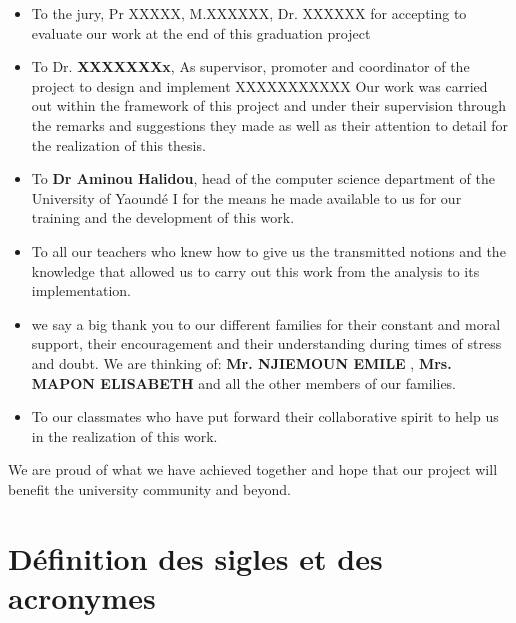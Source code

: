 \documentclass[12pt,a4paper,oneside]{extbook}
\begin{document}
\begin{itemize}
    

\item To the jury, Pr XXXXX, M.XXXXXX, Dr. XXXXXX for accepting to evaluate our
work at the end of this graduation project



\item To Dr. \textbf{ XXXXXXXx}, As supervisor, promoter and coordinator of the project to design and implement XXXXXXXXXXX Our work was carried out within the framework of this project and under their supervision through the remarks and suggestions they made as well as their attention to detail for the realization of this thesis.


\item To \textbf{Dr Aminou Halidou}, head of the computer science department of the University of Yaoundé I for the means he made available to us for our training and the development of this work.

\item To all our teachers who knew how to give us the transmitted notions and the knowledge that allowed us to carry out this work from the analysis to its implementation.

\item we say a big thank you to our different families for their constant and moral support, their encouragement and their understanding during times of stress and doubt. We are thinking of: \textbf{ Mr. NJIEMOUN EMILE }, \textbf{ Mrs. MAPON ELISABETH}  and all the other members of our families.

\item To our classmates who have put forward their collaborative spirit to help us in the realization of this work.

 
\end{itemize}
We are proud of what we have achieved together and hope that our project will benefit the university community and beyond.


\tableofcontents
\listoftables

\renewcommand{\listfigurename}{Liste des figures}
\listoffigures

\newpage
\section*{Définition des sigles et des acronymes}
\begin{table}[H]
   


\end{table}
\end{document}
